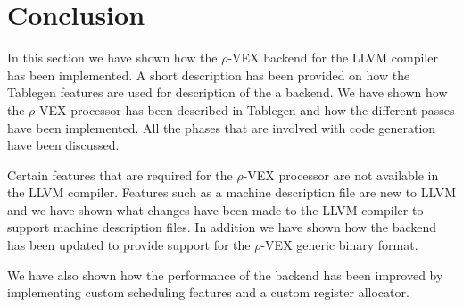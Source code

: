 \section{Conclusion}
In this section we have shown how the $\rho$-VEX backend for the LLVM compiler has been implemented. A short description has been provided on how the Tablegen features are used for description of the a backend. We have shown how the $\rho$-VEX processor has been described in Tablegen and how the different passes have been implemented. All the phases that are involved with code generation have been discussed.

Certain features that are required for the $\rho$-VEX processor are not available in the LLVM compiler. Features such as a machine description file are new to LLVM and we have shown what changes have been made to the LLVM compiler to support machine description files. In addition we have shown how the backend has been updated to provide support for the $\rho$-VEX generic binary format.

We have also shown how the performance of the backend has been improved by implementing custom scheduling features and a custom register allocator.


\acresetall
